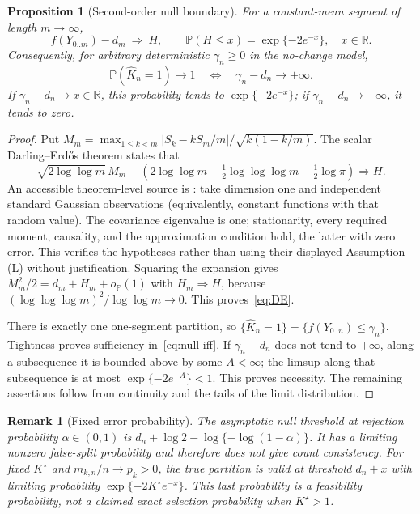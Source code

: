 \documentclass[pdflatex,sn-mathphys-num]{sn-jnl}
\newcommand{\Prob}{\mathbb P}
\newcommand{\R}{\mathbb R}
\newcommand{\Kh}{\widehat K_n}
\newcommand{\op}{o_{\Prob}}
\theoremstyle{thmstyleone}
\newtheorem{proposition}[theorem]{Proposition}
\theoremstyle{thmstyletwo}
\newtheorem{remark}{Remark}
\begin{document}
\begin{proposition}[Second-order null boundary]\label{prop:DE}
For a constant-mean segment of length $m\to\infty$,
\begin{equation}\label{eq:DE}
f(Y_{0..m})-d_m\ \Longrightarrow\ H,
\qquad \Prob(H\le x)=\exp\{-2e^{-x}\},\quad x\in\R.
\end{equation}
Consequently, for arbitrary deterministic $\gamma_n\ge0$ in the no-change model,
\begin{equation}\label{eq:null-iff}
\Prob(\Kh=1)\to1\quad\Longleftrightarrow\quad\gamma_n-d_n\to+\infty.
\end{equation}
If $\gamma_n-d_n\to x\in\R$, this probability tends to $\exp\{-2e^{-x}\}$;
if $\gamma_n-d_n\to-\infty$, it tends to zero.
\end{proposition}
\begin{proof}
Put $M_m=\max_{1\le k<m}|S_k-kS_m/m|/\sqrt{k(1-k/m)}$.
The scalar Darling--Erd\H{o}s theorem states that
\[
\sqrt{2\log\log m}\,M_m-
\left(2\log\log m+\tfrac12\log\log\log m-\tfrac12\log\pi\right)
\Longrightarrow H.
\]
An accessible theorem-level source is \cite[Equation (3.7), p.~8, and
Theorem 3.10, p.~11]{torgovitski2016}: take dimension one and independent
standard Gaussian observations (equivalently, constant functions with that
random value). The covariance eigenvalue is one; stationarity, every required
moment, causality, and the approximation condition hold, the latter with zero
error. This verifies the hypotheses rather than using their displayed
Assumption (L) without justification.
Squaring the expansion gives $M_m^2/2=d_m+H_m+\op(1)$ with
$H_m\Longrightarrow H$, because $(\log\log\log m)^2/\log\log m\to0$.
This proves~\eqref{eq:DE}.

There is exactly one one-segment partition, so $\{\Kh=1\}=
\{f(Y_{0..n})\le\gamma_n\}$. Tightness proves sufficiency in~\eqref{eq:null-iff}.
If $\gamma_n-d_n$ does not tend to $+\infty$, along a subsequence it is bounded
above by some $A<\infty$; the limsup along that subsequence is at most
$\exp\{-2e^{-A}\}<1$. This proves necessity. The remaining assertions follow
from continuity and the tails of the limit distribution.
\end{proof}

\begin{remark}[Fixed error probability]
The asymptotic null threshold at rejection probability $\alpha\in(0,1)$ is
$d_n+\log2-\log\{-\log(1-\alpha)\}$. It has a limiting nonzero false-split
probability and therefore does not give count consistency. For fixed
$K^\star$ and $m_{k,n}/n\to p_k>0$, the true partition is valid at threshold
$d_n+x$ with limiting probability $\exp\{-2K^\star e^{-x}\}$.
This last probability is a feasibility probability, not a claimed exact
selection probability when $K^\star>1$.
\end{remark}
\end{document}
